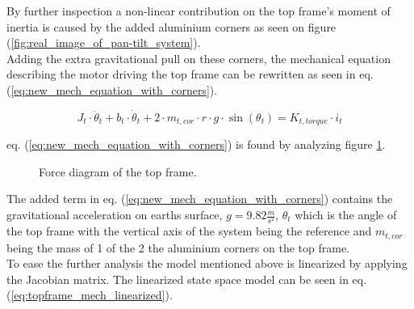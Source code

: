 \documentclass[../../main]{subfiles}
\begin{document}
By further inspection a non-linear contribution on the top frame's moment of inertia is caused by the added aluminium corners as seen on figure (\ref{fig:real_image_of_pan-tilt_system}).\\
Adding the extra gravitational pull on these corners, the mechanical equation describing the motor driving the top frame can be rewritten as seen in eq. (\ref{eq:new_mech_equation_with_corners}).

\begin{equation}
  \label{eq:new_mech_equation_with_corners}
  J_t\cdot \ddot \theta_t + b_t\cdot \dot \theta_t + 2\cdot m_{t,cor} \cdot r \cdot g \cdot \sin(\theta_t) = K_{t,torque}\cdot i_t
\end{equation}

eq. (\ref{eq:new_mech_equation_with_corners}) is found by analyzing figure \ref{fig:TrekantDiagramForce}.

\begin{figure}[h]
  \centering
  \def\svgwidth{0.4\columnwidth}
  
  \caption{Force diagram of the top frame.}
  \label{fig:TrekantDiagramForce}
\end{figure}

The added term in eq. (\ref{eq:new_mech_equation_with_corners}) contains the gravitational acceleration on earths surface, $g = 9.82 \si{\frac{m}{s^2}}$, $\theta_t$ which is the angle of the top frame with the vertical axis of the system being the reference and $m_{t,cor}$ being the mass of 1 of the 2 the aluminium corners on the top frame.\\
To ease the further analysis the model mentioned above is linearized by applying the Jacobian matrix. The linearized state space model can be seen in eq. (\ref{eq:topframe_mech_linearized}).
\end{document}
